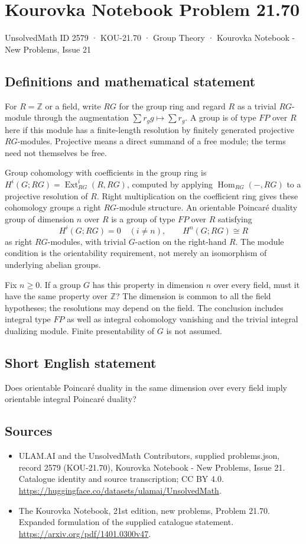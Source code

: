 \documentclass[11pt,a4paper]{article}
\begin{document}
\section*{Kourovka Notebook Problem 21.70}\label{2579}
{\small UnsolvedMath ID 2579 · KOU-21.70 · Group Theory · Kourovka Notebook - New Problems, Issue 21}
\subsection{Definitions and mathematical statement}
For $R=\mathbb Z$ or a field, write $RG$ for the group ring and regard
$R$ as a trivial $RG$-module through the augmentation
$\sum r_g g\mapsto\sum r_g$. A group is of type $FP$ over $R$ here
if this module has a finite-length resolution by finitely generated
projective $RG$-modules. Projective means a direct summand of a free
module; the terms need not themselves be free.

Group cohomology with coefficients in the group ring is
$H^i(G;RG)=\operatorname{Ext}_{RG}^i(R,RG)$, computed by applying
$\operatorname{Hom}_{RG}(-,RG)$ to a projective resolution of $R$.
Right multiplication on the coefficient ring gives these cohomology
groups a right $RG$-module structure.
An orientable Poincar\'e duality group of dimension $n$ over $R$ is a
group of type $FP$ over $R$ satisfying
\[
 H^i(G;RG)=0\quad(i\ne n),\qquad H^n(G;RG)\cong R
\]
as right $RG$-modules, with trivial $G$-action on the right-hand $R$.
The module condition is the orientability requirement, not merely an
isomorphism of underlying abelian groups.

Fix $n\ge0$. If a group $G$ has this property in dimension $n$ over
every field, must it have the same property over $\mathbb Z$?
The dimension is common to all the field hypotheses; the resolutions
may depend on the field. The conclusion includes integral type $FP$
as well as integral cohomology vanishing and the trivial integral
dualizing module. Finite presentability of $G$ is not assumed.
\subsection{Short English statement}
Does orientable Poincaré duality in the same dimension over every field imply orientable integral Poincaré duality?
\subsection{Sources}
\begin{itemize}
\item[S1] ULAM.AI and the UnsolvedMath Contributors, supplied problems.json, record 2579 (KOU-21.70), Kourovka Notebook - New Problems, Issue 21. Catalogue identity and source transcription; CC BY 4.0.
\url{https://huggingface.co/datasets/ulamai/UnsolvedMath}.
\item[S2] The Kourovka Notebook, 21st edition, new problems, Problem 21.70. Expanded formulation of the supplied catalogue statement.
\url{https://arxiv.org/pdf/1401.0300v47}.
\end{itemize}
\end{document}
